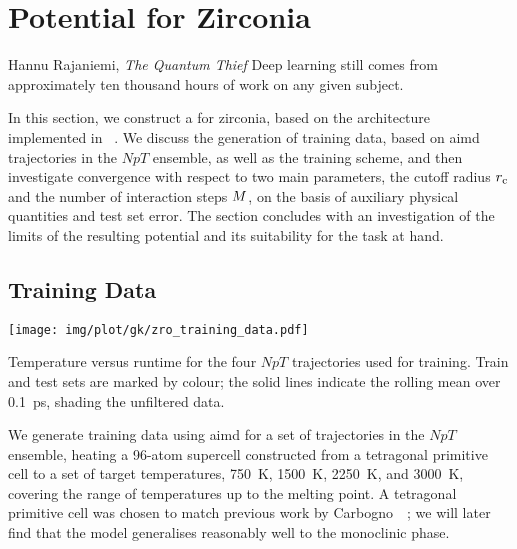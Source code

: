 
\chapter{Potential for Zirconia}
\label{ch:gk-model}

\begin{chapquote}{Hannu Rajaniemi, \textit{The Quantum Thief}}
  Deep learning still comes from approximately ten thousand hours of work on any given subject.
\end{chapquote}

\noindent
In this section, we construct a \mlp for zirconia, based on the \schnet \cite{sktm2017q,sktm2019q} \mpnn architecture implemented in \schnetpack~\cite{sktm2019q}. We discuss the generation of training data, based on \gls{aimd} trajectories in the $NpT$ ensemble, as well as the training scheme, and then investigate convergence with respect to two main parameters, the cutoff radius $r_{\text{c}}$ and the number of interaction steps $M$, on the basis of auxiliary physical quantities and test set error. The section concludes with an investigation of the limits of the resulting potential and its suitability for the task at hand.

\section{Training Data}

\begin{marginfigure}
  \centering
  \texttt{[image: img/plot/gk/zro\_training\_data.pdf]}
  \caption{
  Temperature versus runtime for the four $NpT$ trajectories used for training. Train and test sets are marked by colour; the solid lines indicate the rolling mean over \qty{0.1}{ps}, shading the unfiltered data.
  }
  \label{fig:gkm_NpTs}
\end{marginfigure}
We generate training data using \gls{aimd} for a set of trajectories in the $NpT$ ensemble, heating a 96-atom supercell constructed from a tetragonal primitive cell to a set of target temperatures, \qty{750}{K}, \qty{1500}{K}, \qty{2250}{K}, and \qty{3000}{K}, covering the range of temperatures up to the melting point. A tetragonal primitive cell was chosen to match previous work by Carbogno~\etal{}~\cite{crs2017t}; we will later find that the model generalises reasonably well to the monoclinic phase.

